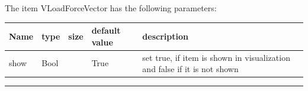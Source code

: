 The item VLoadForceVector has the following parameters:\vspace{-1cm}\\ 
\begin{center}
  \footnotesize
  \begin{longtable}{| p{4.5cm} | p{2.5cm} | p{0.5cm} | p{2.5cm} | p{6cm} |}
    \hline
    \bf Name & \bf type & \bf size & \bf default value & \bf description \\ \hline
    show &     Bool &      &     True &     set true, if item is shown in visualization and false if it is not shown\\ \hline
	  \end{longtable}
	\end{center}
\par\noindent\rule{\textwidth}{0.4pt}
\label{description_LoadForceVector}
